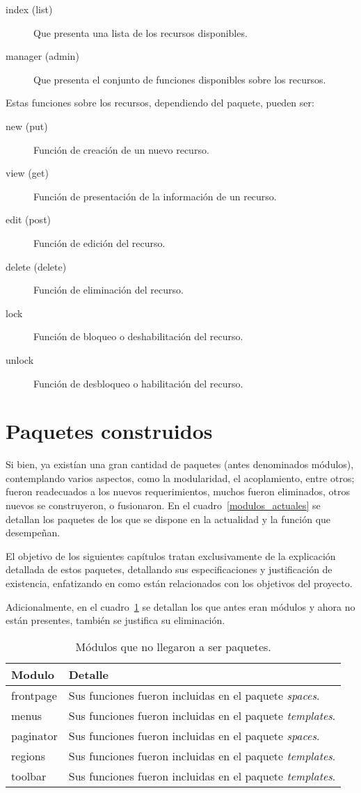 \begin{description}
\item [index (list)] Que presenta una lista de los recursos disponibles.
\item [manager (admin)] Que presenta el conjunto de funciones disponibles sobre
los recursos.
\end{description}

Estas funciones sobre los recursos, dependiendo del paquete, pueden ser:

\begin{description}
\item [new (put)] Función de creación de un nuevo recurso.
\item [view (get)] Función de presentación de la información de un recurso.
\item [edit (post)] Función de edición del recurso.
\item [delete (delete)] Función de eliminación del recurso.
\item [lock] Función de bloqueo o deshabilitación del recurso.
\item [unlock] Función de desbloqueo o habilitación del recurso.
\end{description}

\section{Paquetes construidos}
Si bien, ya existían una gran cantidad de paquetes (antes denominados módulos),
contemplando varios aspectos, como la modularidad, el acoplamiento, entre otros;
fueron readecuados a los nuevos requerimientos, muchos fueron eliminados, otros
nuevos se construyeron, o fusionaron. En el cuadro~\ref{modulos_actuales} se
detallan los paquetes de los que se dispone en la actualidad y la función que
desempeñan.

El objetivo de los siguientes capítulos tratan exclusivamente de la explicación detallada de estos paquetes, detallando sus especificaciones y justificación de existencia, enfatizando en como están relacionados con los objetivos del proyecto.

Adicionalmente, en el cuadro~\ref{modulos_eliminados} se detallan los que antes eran módulos y ahora no están presentes, también se justifica su eliminación.

\begin{table}
\begin{tabular}{l|l}
Modulo & Detalle \\
\hline
frontpage & Sus funciones fueron incluidas en el paquete \emph{spaces}. \\
menus & Sus funciones fueron incluidas en el paquete \emph{templates}. \\
paginator & Sus funciones fueron incluidas en el paquete \emph{spaces}. \\
regions & Sus funciones fueron incluidas en el paquete \emph{templates}. \\
toolbar & Sus funciones fueron incluidas en el paquete \emph{templates}. \\
\end{tabular}
\caption{Módulos que no llegaron a ser paquetes.}
\label{modulos_eliminados}
\end{table}

